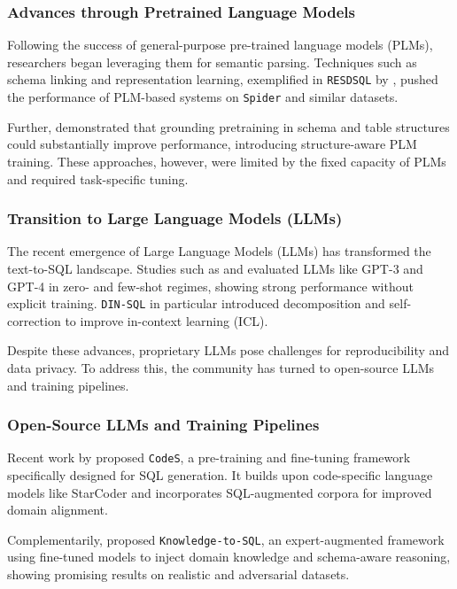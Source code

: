 \subsubsection{Advances through Pretrained Language Models}

Following the success of general-purpose pre-trained language models (PLMs), researchers began leveraging them for semantic parsing. Techniques such as schema linking and representation learning, exemplified in \texttt{RESDSQL} by \citet{li2023resdsql}, pushed the performance of PLM-based systems on \texttt{Spider} and similar datasets.

Further, \citet{deng2021structure} demonstrated that grounding pretraining in schema and table structures could substantially improve performance, introducing structure-aware PLM training. These approaches, however, were limited by the fixed capacity of PLMs and required task-specific tuning.

\subsubsection{Transition to Large Language Models (LLMs)}

The recent emergence of Large Language Models (LLMs) has transformed the text-to-SQL landscape. Studies such as \citet{rajkumar2022evaluating} and \citet{pourreza2023dinsql} evaluated LLMs like GPT-3 and GPT-4 in zero- and few-shot regimes, showing strong performance without explicit training. \texttt{DIN-SQL} in particular introduced decomposition and self-correction to improve in-context learning (ICL).

Despite these advances, proprietary LLMs pose challenges for reproducibility and data privacy. To address this, the community has turned to open-source LLMs and training pipelines.

\subsubsection{Open-Source LLMs and Training Pipelines}

Recent work by \citet{li2024codes} proposed \texttt{CodeS}, a pre-training and fine-tuning framework specifically designed for SQL generation. It builds upon code-specific language models like StarCoder and incorporates SQL-augmented corpora for improved domain alignment.

Complementarily, \citet{hong2024knowledge} proposed \texttt{Knowledge-to-SQL}, an expert-augmented framework using fine-tuned models to inject domain knowledge and schema-aware reasoning, showing promising results on realistic and adversarial datasets.

